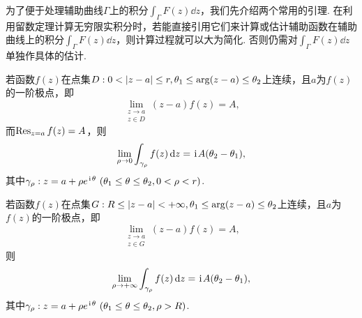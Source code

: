 为了便于处理辅助曲线\(\Gamma\)上的积分\(\int_\Gamma F(z) \dd{z}\)，我们先介绍两个常用的引理.
在利用留数定理计算无穷限实积分时，若能直接引用它们来计算或估计辅助函数在辅助曲线上的积分\(\int_\Gamma F(z) \dd{z}\)，则计算过程就可以大为简化.
否则仍需对\(\int_\Gamma F(z) \dd{z}\)单独作具体的估计.

\begin{lemma}\label{theorem:留数定理.计算积分路径上没有奇点的无穷限积分.引理1}
若函数\(f(z)\)在点集\(D: 0<\abs{z-a}\leq r, \theta_1 \leq \arg(z-a) \leq \theta_2\)上连续，且\(a\)为\(f(z)\)的一阶极点，即\begin{equation}
\lim_{\substack{z \to a \\ z \in D}} (z-a) f(z) = A,
\end{equation}
而\(\operatorname{Res}_{z=a} f(z) = A\)，则\begin{equation}
\lim_{\rho\to0} \int_{\gamma_{\rho}} f(z) \dd{z} = \kern1pt\mathrm{i}\kern1pt A (\theta_2-\theta_1),
\end{equation}
其中\(\gamma_{\rho}: z=a+\rho e^{\kern1pt\mathrm{i}\kern1pt\theta}\ (\theta_1 \leq \theta \leq \theta_2, 0 < \rho < r)\).

若函数\(f(z)\)在点集\(G: R \leq \abs{z-a} < +\infty, \theta_1 \leq \arg(z-a) \leq \theta_2\)上连续，且\(a\)为\(f(z)\)的一阶极点，即\begin{equation}
\lim_{\substack{z \to a \\ z \in G}} (z-a) f(z) = A,
\end{equation}则\begin{equation}
\lim_{\rho\to+\infty} \int_{\gamma_{\rho}} f(z) \dd{z} = \kern1pt\mathrm{i}\kern1pt A (\theta_2-\theta_1),
\end{equation}
其中\(\gamma_{\rho}: z=a+\rho e^{\kern1pt\mathrm{i}\kern1pt\theta}\ (\theta_1 \leq \theta \leq \theta_2, \rho > R)\).
\end{lemma}

